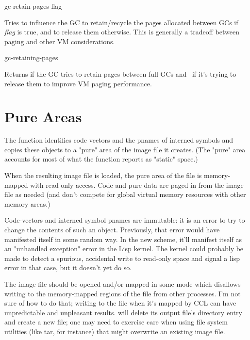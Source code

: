 \begin{defun}[Function]
gc-retain-pages flag

Tries to influence the GC to retain/recycle the pages allocated
between GCs if {\it flag} is true, and to release them otherwise. This is
generally a tradeoff between paging and other VM considerations.
\end{defun}

\begin{defun}[Function]
gc-retaining-pages

Returns  if the GC tries to retain pages between full GCs and \nil\ if
it's trying to release them to improve VM paging performance.
\end{defun}


\section{Pure Areas}

The function  identifies code vectors and the
pnames of interned symbols and copies these objects to a "pure" area
of the image file it creates. (The "pure" area accounts for most of
what the  function reports as "static" space.)

When the resulting image file is loaded, the pure area of the file is
memory-mapped with read-only access. Code and pure data are paged in
from the image file as needed (and don't compete for global virtual
memory resources with other memory areas.)

Code-vectors and interned symbol pnames are immutable: it is an error
to try to change the contents of such an object. Previously, that
error would have manifested itself in some random way. In the new
scheme, it'll manifest itself as an "unhandled exception" error in the
Lisp kernel. The kernel could probably be made to detect a spurious,
accidental write to read-only space and signal a lisp error in that
case, but it doesn't yet do so.

The image file should be opened and/or mapped in some mode which
disallows writing to the memory-mapped regions of the file from other
processes. I'm not sure of how to do that; writing to the file when
it's mapped by CCL can have unpredictable and unpleasant
results.  will delete its output file's directory
entry and create a new file; one may need to exercise care when using
file system utilities (like tar, for instance) that might overwrite an
existing image file.


